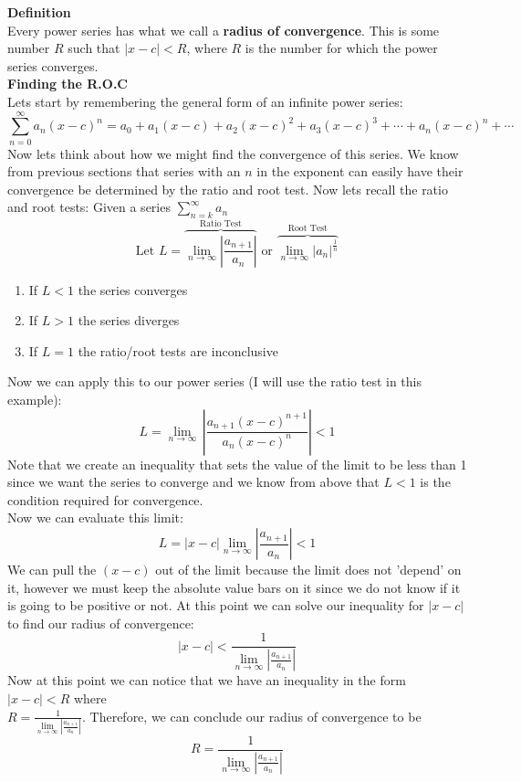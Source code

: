 \documentclass[addpoints]{exam}
\begin{document}
\begin{tcolorbox}[title= RADIUS OF CONVERGENCE,colframe=black,sharp corners,colback=white,colbacktitle=white,coltitle=black]

   \large \textbf{Definition} \\
   \normalsize Every power series has what we call a \textbf{radius of convergence}. This is some number $R$ such that \(\left|x-c\right| < R\), where $R$ is the number for which the power series converges. \\
   \large \textbf{Finding the R.O.C} \\
   \normalsize Lets start by remembering the general form of an infinite power series:
    \[\sum_{n=0}^{\infty}a_n (x-c)^n=a_0 + a_1 (x-c)+a_2 (x-c)^2+a_3 (x-c)^3+\cdots+a_n (x-c)^n+\cdots\]
    Now lets think about how we might find the convergence of this series. We know from previous sections that series with an $n$ in the exponent can easily have their convergence be determined by the ratio and root test. Now lets recall the ratio and root tests:
    Given a series \(\displaystyle
        \sum\limits_{n=k}^{\infty} a_n
    \)
    \[ \displaystyle
        \text{Let } L =
        \overbrace{\lim\limits_{n\to\infty}\left|\frac{a_{n+1}}{a_n}\right|}^{\text{Ratio Test}}
        \text{ or }
        \overbrace{\lim\limits_{n\to\infty}\left|{a_n}\right|^{\frac{1}{n}}}^{\text{Root Test}}
    \]
    \begin{enumerate}
        \item If $L<1$ the series converges
        \item If $L>1$ the series diverges
        \item If $L=1$ the ratio/root tests are inconclusive
    \end{enumerate}
    Now we can apply this to our power series (I will use the ratio test in this example):
    \[
    L = \lim\limits_{n\to\infty}\, \left|\frac{a_{n+1}\left({x-c}\right)^{n+1}}{a_n\left({x-c}\right)^{n}} \right| < 1
    \]
    Note that we create an inequality that sets the value of the limit to be less than 1 since we want the series to converge and we know from above that $L<1$ is the condition required for convergence. \\
    Now we can evaluate this limit:
    \[
    L = \left|x-c\right| \lim\limits_{n\to\infty}\left|\frac{a_{n+1}}{a_n}\right| < 1
    \]
    We can pull the $(x-c)$ out of the limit because the limit does not 'depend' on it, however we must keep the absolute value bars on it since we do not know if it is going to be positive or not.
    At this point we can solve our inequality for \(\left|x-c\right|\) to find our radius of convergence:
    \[
    \left|x-c\right| < \frac{1}{ \lim\limits_{n\to\infty}\left|\frac{a_{n+1}}{a_n}\right|}
    \]
    Now at this point we can notice that we have an inequality in the form \(\left|x-c\right| < R\) where \\ \(R = \frac{1}{ \lim\limits_{n\to\infty}\left|\frac{a_{n+1}}{a_n}\right|}\). Therefore, we can conclude our radius of convergence to be 
    \[
    R = \frac{1}{ \lim\limits_{n\to\infty}\left|\frac{a_{n+1}}{a_n}\right|} 
    \]
    
    
\end{tcolorbox}
\newpage
\end{document}
